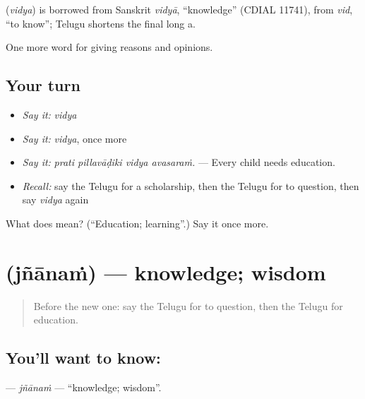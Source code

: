 \begin{cousinweb}
\textbf{} (\emph{vidya}) is borrowed from Sanskrit \emph{vidyā}, \textquotedblleft{}knowledge\textquotedblright{} (CDIAL 11741), from \emph{vid}, \textquotedblleft{}to know\textquotedblright{}; Telugu shortens the final long a.
\end{cousinweb}

\begin{grammarlens}[title={What you've built}]
One more word for giving reasons and opinions.
\end{grammarlens}

\subsection*{Your turn}
\begin{itemize}
\raggedright
  \item \emph{Say it:} \emph{vidya}
  \item \emph{Say it:} \emph{vidya}, once more
  \item \emph{Say it:} \emph{prati pillavāḍiki vidya avasaraṁ.} — Every child needs education.
  \item \emph{Recall:} say the Telugu for a scholarship, then the Telugu for to question, then say \emph{vidya} again
\end{itemize}

\begin{tcolorbox}[breakable,colback=teal!4,colframe=teal!35!black,title={Before you move on}]
What does  mean? (\textquotedblleft{}Education; learning\textquotedblright{}.) Say it once more.
\end{tcolorbox}
\section[\texorpdfstring{\te{జ్ఞానం} (jñānaṁ)}{జ్ఞానం (jñānaṁ)}]{ (jñānaṁ) — knowledge; wisdom}

\label{lesson:TE-C415-jnanam}



\begin{quote}
Before the new one: say the Telugu for to question, then the Telugu for education.
\end{quote}

\subsection*{You'll want to know: }
\textbf{} — \emph{jñānaṁ} — \textquotedblleft{}knowledge; wisdom\textquotedblright{}.


